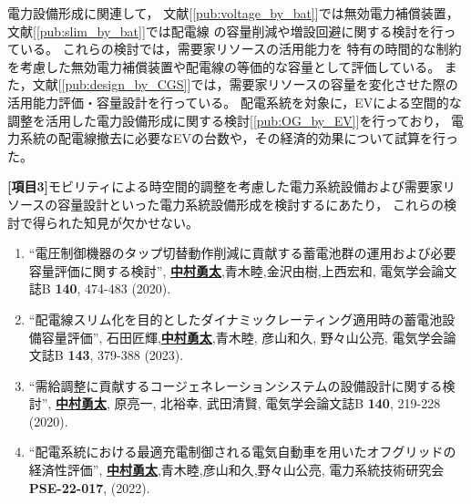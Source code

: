 \documentclass[11pt,a4paper,uplatex,dvipdfmx]{ujarticle} 		%
\newcommand{\研究課題名}{モビリティの時空間調整を活用した電力設備形成構築}
\newcommand{\研究機関名}{名古屋工業大学}
\newcommand{\研究代表者氏名}{中村勇太}
\newcommand{\研究期間の最終元号年度}{10}  %
\newcommand{\paper}[6]{%
	\item ``#1'', #2, #3 {\bf #4}, #5 (#6).			%
}
\begin{document}
	電力設備形成に関連して，
	文献[\ref{pub:voltage_by_bat}]では無効電力補償装置，
	文献[\ref{pub:slim_by_bat}]では配電線
	の容量削減や増設回避に関する検討を行っている。%
	これらの検討では，需要家リソースの活用能力を%
	特有の時間的な制約を考慮した無効電力補償装置や配電線の等価的な容量として評価している。
	また，文献[\ref{pub:design_by_CGS}]では，需要家リソースの容量を変化させた際の活用能力評価・容量設計を行っている。
	配電系統を対象に，EVによる空間的な調整を活用した電力設備形成に関する検討[\ref{pub:OG_by_EV}]を行っており，
	電力系統の配電線撤去に必要なEVの台数や，その経済的効果について試算を行った。	

	\textbf{[項目3]}モビリティによる時空間的調整を考慮した電力系統設備および需要家リソースの容量設計といった電力系統設備形成を検討するにあたり，
	これらの検討で得られた知見が欠かせない。
	

	\vspace{-0.5\baselineskip}           %
	
	\begin{enumerate}
		\setlength{\itemsep}{-5pt}
		\setcounter{enumi}{7}

		\paper{電圧制御機器のタップ切替動作削減に貢献する蓄電池群の運用および必要容量評価に関する検討}{\textbf{\ul{中村勇太}},青木睦,金沢由樹,上西宏和}{電気学会論文誌B}{140}{474-483}{2020}\label{pub:voltage_by_bat}
		
		\paper{配電線スリム化を目的としたダイナミックレーティング適用時の蓄電池設備容量評価}{石田匠輝,\textbf{\ul{中村勇太}},青木睦, 彦山和久, 野々山公亮}{電気学会論文誌B}{143}{379-388}{2023}\label{pub:slim_by_bat}

		\paper{需給調整に貢献するコージェネレーションシステムの設備設計に関する検討}{\textbf{\ul{中村勇太}}, 原亮一, 北裕幸, 武田清賢}{電気学会論文誌B}{140}{219-228}{2020}\label{pub:design_by_CGS}
		

		\paper{配電系統における最適充電制御される電気自動車を用いたオフグリッドの経済性評価}{\textbf{\ul{中村勇太}},青木睦,彦山和久,野々山公亮}{電力系統技術研究会}{PSE-22-017}{}{2022}\label{pub:OG_by_EV}
		
	\end{enumerate}
	\vspace{-0.5\baselineskip}           %
		
\end{document}
